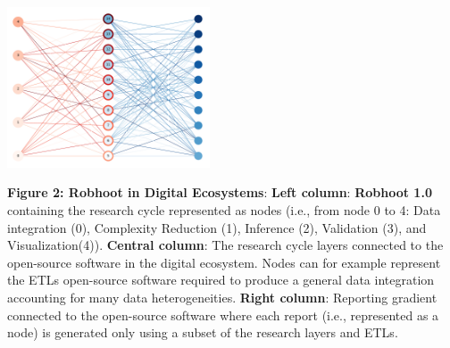 \documentclass[10pt, a4paper, twocolumn]{article} %
\begin{document}
{\includegraphics[width=0.45\textwidth]{FigureRobhoot.pdf}

{\small {\bf Figure 2: Robhoot in Digital Ecosystems}: {\bf Left
    column}: {\bf Robhoot 1.0} containing the research cycle
  represented as nodes (i.e., from node 0 to 4: Data integration (0),
  Complexity Reduction (1), Inference (2), Validation (3), and
  Visualization(4)). {\bf Central column}: The research cycle layers
  connected to the open-source software in the digital
  ecosystem. Nodes can for example represent the ETLs open-source
  software required to produce a general data integration accounting
  for many data heterogeneities. {\bf Right column}: Reporting
  gradient connected to the open-source software where each report
  (i.e., represented as a node) is generated only using a subset of
  the research layers and ETLs.}




}
\end{document}
